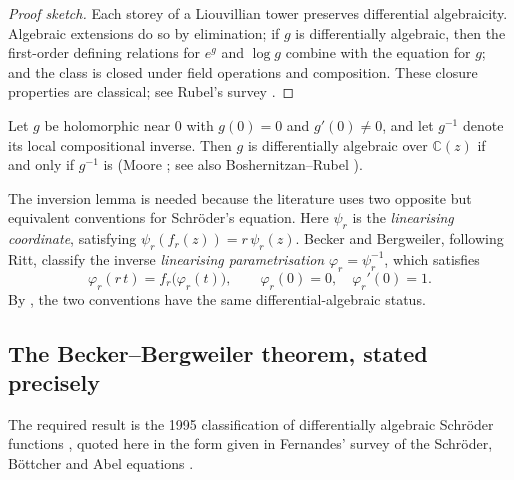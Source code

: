 \begin{proof}[Proof sketch]
Each storey of a Liouvillian tower preserves differential algebraicity.  Algebraic
extensions do so by elimination; if $g$ is differentially algebraic, then the
first-order defining relations for $e^g$ and $\log g$ combine with the equation for
$g$; and the class is closed under field operations and composition.  These
closure properties are classical; see Rubel's survey \cite{Rubel1989}.
\end{proof}

\begin{lemma}
\label{a:lem:inv-da}
Let $g$ be holomorphic near $0$ with $g(0)=0$ and $g'(0)\neq0$, and let $g^{-1}$ denote its local compositional inverse. Then $g$ is differentially algebraic over $\mathbb{C}(z)$ if and only if $g^{-1}$ is (Moore \cite{Moore1896}; see also Boshernitzan--Rubel \cite{BoshernitzanRubel1986}).
\end{lemma}

The inversion lemma is needed because the literature uses two opposite but
equivalent conventions for Schr\"oder's equation.  Here $\psi_r$ is the
\emph{linearising coordinate}, satisfying
$\psi_r(f_r(z))=r\,\psi_r(z)$.  Becker and Bergweiler, following Ritt, classify
the inverse \emph{linearising parametrisation} $\varphi_r=\psi_r^{-1}$, which
satisfies
\begin{equation}
\label{a:eq:schroder-param}
\varphi_r(r\,t)=f_r\bigl(\varphi_r(t)\bigr),
\qquad
\varphi_r(0)=0,\quad \varphi_r'(0)=1 .
\end{equation}
By , the two conventions have the same differential-algebraic
status.

\subsection{The Becker--Bergweiler theorem, stated precisely}

The required result is the 1995 classification of differentially algebraic
Schr\"oder functions \cite{Becker1995}, quoted here in the form given in Fernandes'
survey of the Schr\"oder, B\"ottcher and Abel equations
\cite[Thm~3.1]{Fernandes2021}.

